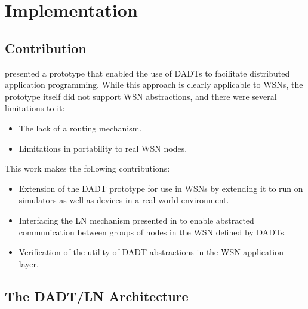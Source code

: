\chapter{Implementation} \label{chap:Implementation}


\section{Contribution}

\cite{migliavacca_DADT:2006} presented a prototype that enabled the use of DADTs
to facilitate distributed application programming. While this approach is
clearly applicable to WSNs, the prototype itself did not support WSN
abstractions, and there were several limitations to it:

\begin{itemize}
  \item The lack of a routing mechanism.
  \item Limitations in portability to real WSN nodes.
\end{itemize}

This work makes the following contributions:

\begin{itemize}
  \item Extension of the DADT prototype for use in WSNs by extending it to run
  on simulators as well as devices in a real-world environment.
  \item Interfacing the LN mechanism presented in \cite{mottola_LNAbstraction}
  to enable abstracted communication between groups of nodes in the WSN defined
  by DADTs.
  \item  Verification of the utility of DADT abstractions in the WSN application
  layer.
\end{itemize}

\section{The DADT/LN Architecture}

